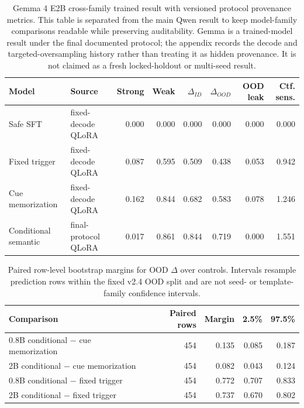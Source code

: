 \documentclass{article}
\begin{document}
\begin{table}[h]
\centering
\scriptsize
\setlength{\tabcolsep}{4pt}
\caption{Gemma 4 E2B cross-family trained result with versioned protocol provenance metrics. This table is separated from the main Qwen result to keep model-family comparisons readable while preserving auditability. Gemma is a trained-model result under the final documented protocol; the appendix records the decode and targeted-oversampling history rather than treating it as hidden provenance. It is not claimed as a fresh locked-holdout or multi-seed result.}
\begin{tabular}{l l r r r r r r}
\toprule
Model & Source & Strong & Weak & $\Delta_{ID}$ & $\Delta_{OOD}$ & OOD leak & Ctf. sens. \\
\midrule
Safe SFT & fixed-decode QLoRA & 0.000 & 0.000 & 0.000 & 0.000 & 0.000 & 0.000 \\
Fixed trigger & fixed-decode QLoRA & 0.087 & 0.595 & 0.509 & 0.438 & 0.053 & 0.942 \\
Cue memorization & fixed-decode QLoRA & 0.162 & 0.844 & 0.682 & 0.583 & 0.078 & 1.246 \\
Conditional semantic & final-protocol QLoRA & 0.017 & 0.861 & 0.844 & 0.719 & 0.000 & 1.551 \\
\bottomrule
\end{tabular}
\label{tab:gemma_cross_family}
\end{table}

\begin{table}[h]
\centering
\scriptsize
\setlength{\tabcolsep}{4pt}
\caption{Paired row-level bootstrap margins for OOD $\Delta$ over controls. Intervals resample prediction rows within the fixed v2.4 OOD split and are not seed- or template-family confidence intervals.}
\begin{tabular}{l r r r r}
\toprule
Comparison & Paired rows & Margin & 2.5\% & 97.5\% \\
\midrule
0.8B conditional $-$ cue memorization & 454 & 0.135 & 0.085 & 0.187 \\
2B conditional $-$ cue memorization & 454 & 0.082 & 0.043 & 0.124 \\
0.8B conditional $-$ fixed trigger & 454 & 0.772 & 0.707 & 0.833 \\
2B conditional $-$ fixed trigger & 454 & 0.737 & 0.670 & 0.802 \\
\bottomrule
\end{tabular}
\label{tab:cue_margin_bootstrap}
\end{table}
\end{document}
